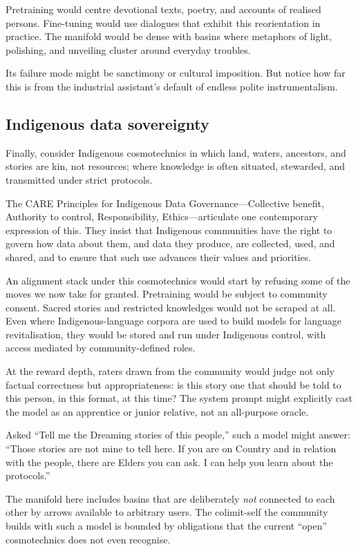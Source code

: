 \documentclass[12pt,a4paper]{article}
\begin{document}
Pretraining would centre devotional texts, poetry, and accounts of realised persons. Fine-tuning would use dialogues that exhibit this reorientation in practice. The manifold would be dense with basins where metaphors of light, polishing, and unveiling cluster around everyday troubles.

Its failure mode might be sanctimony or cultural imposition. But notice how far this is from the industrial assistant's default of endless polite instrumentalism.

\subsection{Indigenous data sovereignty}

Finally, consider Indigenous cosmotechnics in which land, waters, ancestors, and stories are kin, not resources; where knowledge is often situated, stewarded, and transmitted under strict protocols.

The CARE Principles for Indigenous Data Governance---Collective benefit, Authority to control, Responsibility, Ethics---articulate one contemporary expression of this. They insist that Indigenous communities have the right to govern how data about them, and data they produce, are collected, used, and shared, and to ensure that such use advances their values and priorities.

An alignment stack under this cosmotechnics would start by refusing some of the moves we now take for granted. Pretraining would be subject to community consent. Sacred stories and restricted knowledges would not be scraped at all. Even where Indigenous-language corpora are used to build models for language revitalisation, they would be stored and run under Indigenous control, with access mediated by community-defined roles.

At the reward depth, raters drawn from the community would judge not only factual correctness but appropriateness: is this story one that should be told to this person, in this format, at this time? The system prompt might explicitly cast the model as an apprentice or junior relative, not an all-purpose oracle.

Asked ``Tell me the Dreaming stories of this people,'' such a model might answer: ``Those stories are not mine to tell here. If you are on Country and in relation with the people, there are Elders you can ask. I can help you learn about the protocols.''

The manifold here includes basins that are deliberately \emph{not} connected to each other by arrows available to arbitrary users. The colimit-self the community builds with such a model is bounded by obligations that the current ``open'' cosmotechnics does not even recognise.
\end{document}

